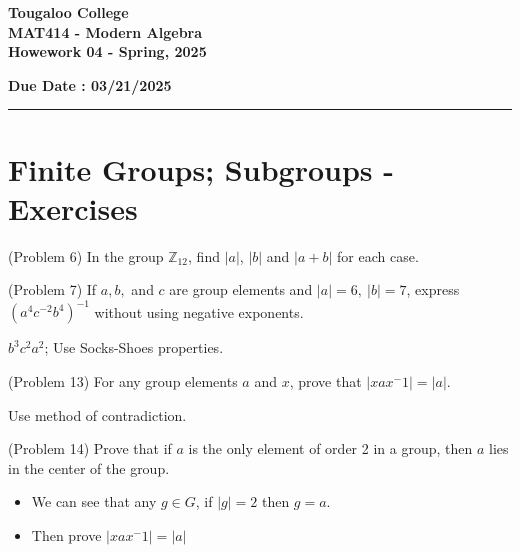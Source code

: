 \documentclass[12pt]{exam}
\newcommand{\paper}[5]{
    \setcounter{page}{1}
    
    \begin{minipage}{\textwidth}
    \Large{\textbf{Tougaloo College}}\\
    \textbf{#2}\\
    \textbf{#5 - #3}\\
    \end{minipage}
    \hfill
        \begin{minipage}{6in}
            \textbf{\hspace{0.25in}Due Date : #1}
        \end{minipage}
    
    \vspace{0.1in}
    \rule[1ex]{\textwidth}{2pt}
    }
\begin{document}
\paper{03/21/2025}{MAT414 - Modern Algebra}{Spring, 2025}{}{Howework 04}

\section*{Finite Groups; Subgroups - Exercises}
\begin{questions}

\question[] (Problem 6) In the group \(\mathbb{Z}_{12}\), find \(|a|\), \(|b|\) and \(|a+b|\) for each case.
\droptotalpoints

\question[20] (Problem 7) If \(a,b,\) and \(c\) are group elements and \(|a|=6,~|b|=7\), express \((a^4c^{-2}b^4)^{-1}\) without using negative exponents.

\begin{solution}
    \(b^3c^2a^2\); Use Socks-Shoes properties. 
\end{solution}

\droptotalpoints

\question[20] (Problem 13) For any group elements \(a\) and \(x\), prove that \(|xax^-1|=|a|\).

\begin{solution}
    Use method of contradiction.
\end{solution}
\droptotalpoints

\question[20] (Problem 14) Prove that if \(a\) is the only element of order 2 in a group, then \(a\) lies in the center of the group. 

\begin{solution}
    \begin{itemize}
        \item We can see that any \(g \in G\), if \(|g|=2\) then \(g=a\).
        \item Then prove \(|xax^-1|=|a|\)
    \end{itemize}
\end{solution}
\droptotalpoints


\end{questions}
\end{document}
